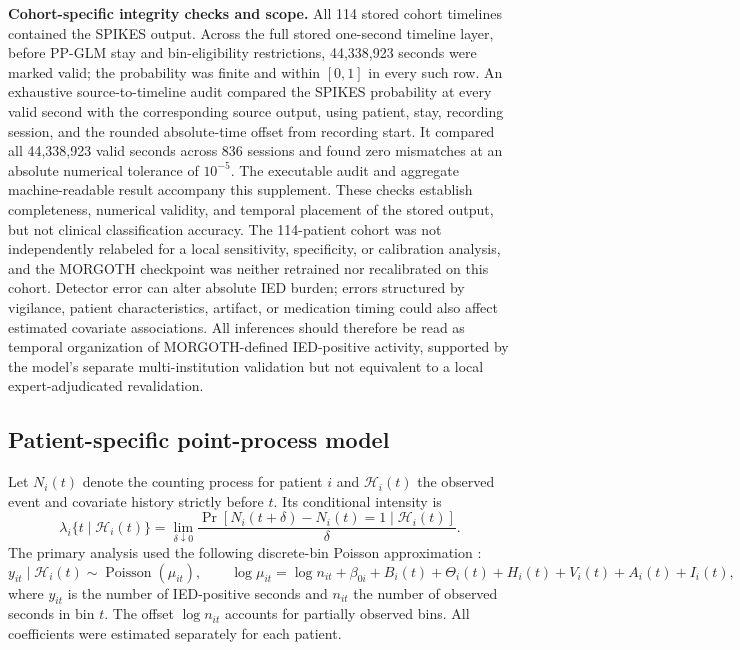 \documentclass[11pt]{article}
\begin{document}
\textbf{Cohort-specific integrity checks and scope.} All 114 stored cohort timelines contained the SPIKES output. Across the full stored one-second timeline layer, before PP-GLM stay and bin-eligibility restrictions, 44,338,923 seconds were marked valid; the probability was finite and within $[0,1]$ in every such row. An exhaustive source-to-timeline audit compared the SPIKES probability at every valid second with the corresponding source output, using patient, stay, recording session, and the rounded absolute-time offset from recording start. It compared all 44,338,923 valid seconds across 836 sessions and found zero mismatches at an absolute numerical tolerance of $10^{-5}$. The executable audit and aggregate machine-readable result accompany this supplement. These checks establish completeness, numerical validity, and temporal placement of the stored output, but not clinical classification accuracy. The 114-patient cohort was not independently relabeled for a local sensitivity, specificity, or calibration analysis, and the MORGOTH checkpoint was neither retrained nor recalibrated on this cohort. Detector error can alter absolute IED burden; errors structured by vigilance, patient characteristics, artifact, or medication timing could also affect estimated covariate associations. All inferences should therefore be read as temporal organization of MORGOTH-defined IED-positive activity, supported by the model's separate multi-institution validation but not equivalent to a local expert-adjudicated revalidation.

\subsection*{Patient-specific point-process model}

Let $N_i(t)$ denote the counting process for patient $i$ and $\mathcal H_i(t)$ the observed event and covariate history strictly before $t$. Its conditional intensity is
\begin{equation}
\lambda_i\{t\mid\mathcal H_i(t)\}
=\lim_{\delta\downarrow0}
\frac{\Pr[N_i(t+\delta)-N_i(t)=1\mid\mathcal H_i(t)]}{\delta}.
\label{eq:intensity}
\end{equation}
The primary analysis used the following discrete-bin Poisson approximation \cite{Truccolo2005,Paninski2004}:
\begin{equation}
y_{it}\mid\mathcal H_i(t)\sim\operatorname{Poisson}(\mu_{it}),\qquad
\log\mu_{it}=\log n_{it}+\beta_{0i}+B_i(t)+\Theta_i(t)+H_i(t)+V_i(t)+A_i(t)+I_i(t),
\label{eq:ppglm}
\end{equation}
where $y_{it}$ is the number of IED-positive seconds and $n_{it}$ the number of observed seconds in bin $t$. The offset $\log n_{it}$ accounts for partially observed bins. All coefficients were estimated separately for each patient.
\end{document}
